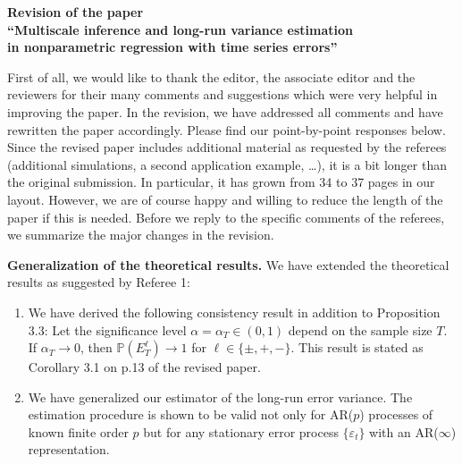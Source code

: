 \documentclass[a4paper,12pt]{article}
\begin{document}
\begin{center} 
{\large \bf Revision of the paper} \\[0.1cm]
{\large \bf ``Multiscale inference and long-run variance estimation} \\[0.1cm]
{\large \bf in nonparametric regression with time series errors''} 
\end{center}
\vspace{7pt}



First of all, we would like to thank the editor, the associate editor and the reviewers for their many comments and suggestions which were very helpful in improving the paper. In the revision, we have addressed all comments and have rewritten the paper accordingly. Please find our point-by-point responses below. Since the revised paper includes additional material as requested by the referees (additional simulations, a second application example, \dots), it is a bit longer than the original submission. In particular, it has grown from 34 to 37 pages in our layout. However, we are of course happy and willing to reduce the length of the paper if this is needed. Before we reply to the specific comments of the referees, we summarize the major changes in the revision.

\vspace{10pt}


\textbf{Generalization of the theoretical results.} We have extended the theoretical results as suggested by Referee 1:
\begin{enumerate}[label=(\roman*), leftmargin=0.8cm]

\item We have derived the following consistency result in addition to Proposition 3.3: Let the significance level $\alpha = \alpha_T \in (0,1)$ depend on the sample size $T$. If $\alpha_T \rightarrow 0$, then $\mathbb{P}({E}_T^{\ell}) \rightarrow 1$ for $\ell \in \{ \pm,+,- \}$. This result is stated as Corollary 3.1 on p.13 of the revised paper. 

\item We have generalized our estimator of the long-run error variance. The estimation procedure is shown to be valid not only for AR($p$) processes of known finite order $p$ but for any stationary error process $\{\varepsilon_t\}$ with an AR($\infty$) representation. %
\end{enumerate}
\vspace{3pt}
\end{document}

